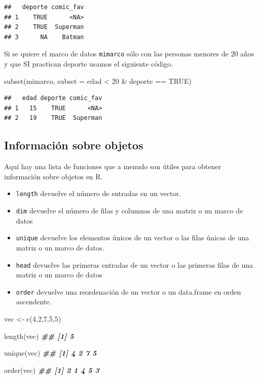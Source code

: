 \documentclass[
]{book}
\newenvironment{Shaded}{\begin{snugshade}}{\end{snugshade}}
\newcommand{\AttributeTok}[1]{\textcolor[rgb]{0.77,0.63,0.00}{#1}}
\newcommand{\ConstantTok}[1]{\textcolor[rgb]{0.00,0.00,0.00}{#1}}
\newcommand{\DecValTok}[1]{\textcolor[rgb]{0.00,0.00,0.81}{#1}}
\newcommand{\DocumentationTok}[1]{\textcolor[rgb]{0.56,0.35,0.01}{\textbf{\textit{#1}}}}
\newcommand{\FunctionTok}[1]{\textcolor[rgb]{0.00,0.00,0.00}{#1}}
\newcommand{\NormalTok}[1]{#1}
\newcommand{\OtherTok}[1]{\textcolor[rgb]{0.56,0.35,0.01}{#1}}
\newcommand{\SpecialCharTok}[1]{\textcolor[rgb]{0.00,0.00,0.00}{#1}}
\begin{document}
\begin{verbatim}
##   deporte comic_fav
## 1    TRUE      <NA>
## 2    TRUE  Superman
## 3      NA    Batman
\end{verbatim}

Si se quiere el marco de datos \texttt{mimarco} sólo con las personas menores de 20 años y que SI practican deporte usamos el siguiente código.

\begin{Shaded}
\begin{Highlighting}[]
\FunctionTok{subset}\NormalTok{(mimarco, }\AttributeTok{subset =}\NormalTok{ edad }\SpecialCharTok{\textless{}} \DecValTok{20} \SpecialCharTok{\&}\NormalTok{ deporte }\SpecialCharTok{==} \ConstantTok{TRUE}\NormalTok{)}
\end{Highlighting}
\end{Shaded}

\begin{verbatim}
##   edad deporte comic_fav
## 1   15    TRUE      <NA>
## 2   19    TRUE  Superman
\end{verbatim}

\hypertarget{informaciuxf3n-sobre-objetos}{%
\subsection{Información sobre objetos}\label{informaciuxf3n-sobre-objetos}}

Aquí hay una lista de funciones que a menudo son útiles para obtener información sobre objetos en R.

\begin{itemize}
\item
  \texttt{length} devuelve el número de entradas en un vector.
\item
  \texttt{dim} devuelve el número de filas y columnas de una matriz o un marco de datos
\item
  \texttt{unique} devuelve los elementos únicos de un vector o las filas únicas de una matriz o un marco de datos.
\item
  \texttt{head} devuelve las primeras entradas de un vector o las primeras filas de una matriz o un marco de datos
\item
  \texttt{order} devuelve una reordenación de un vector o un data.frame en orden ascendente.
\end{itemize}

\begin{Shaded}
\begin{Highlighting}[]
\NormalTok{vec }\OtherTok{\textless{}{-}} \FunctionTok{c}\NormalTok{(}\DecValTok{4}\NormalTok{,}\DecValTok{2}\NormalTok{,}\DecValTok{7}\NormalTok{,}\DecValTok{5}\NormalTok{,}\DecValTok{5}\NormalTok{)}

\FunctionTok{length}\NormalTok{(vec)}
\DocumentationTok{\#\# [1] 5}

\FunctionTok{unique}\NormalTok{(vec)}
\DocumentationTok{\#\# [1] 4 2 7 5}

\FunctionTok{order}\NormalTok{(vec)}
\DocumentationTok{\#\# [1] 2 1 4 5 3}
\end{Highlighting}
\end{Shaded}
\end{document}
